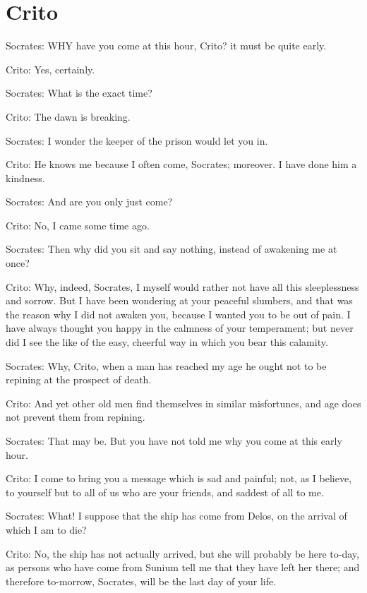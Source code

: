 
\chapter{Crito} %
\label{cha:crito}





Socrates: WHY have you come at this hour, Crito? it must be quite
early. 

Crito: Yes, certainly. 

Socrates: What is the exact time? 

Crito: The dawn is breaking. 

Socrates: I wonder the keeper of the prison would let you in.

Crito: He knows me because I often come, Socrates; moreover. I have done
him a kindness. 

Socrates: And are you only just come? 

Crito: No, I came some time ago. 

Socrates: Then why did you sit and say nothing, instead of awakening me
at once? 

Crito: Why, indeed, Socrates, I myself would rather not have all this
sleeplessness and sorrow. But I have been wondering at your peaceful
slumbers, and that was the reason why I did not awaken you, because
I wanted you to be out of pain. I have always thought you happy in
the calmness of your temperament; but never did I see the like of
the easy, cheerful way in which you bear this calamity. 

Socrates: Why, Crito, when a man has reached my age he ought not to be
repining at the prospect of death. 

Crito: And yet other old men find themselves in similar misfortunes,
and age does not prevent them from repining. 

Socrates: That may be. But you have not told me why you come at this early
hour. 

Crito: I come to bring you a message which is sad and painful; not, as
I believe, to yourself but to all of us who are your friends, and
saddest of all to me. 

Socrates: What! I suppose that the ship has come from Delos, on the arrival
of which I am to die? 

Crito: No, the ship has not actually arrived, but she will probably be
here to-day, as persons who have come from Sunium tell me that they
have left her there; and therefore to-morrow, Socrates, will be the
last day of your life. 

